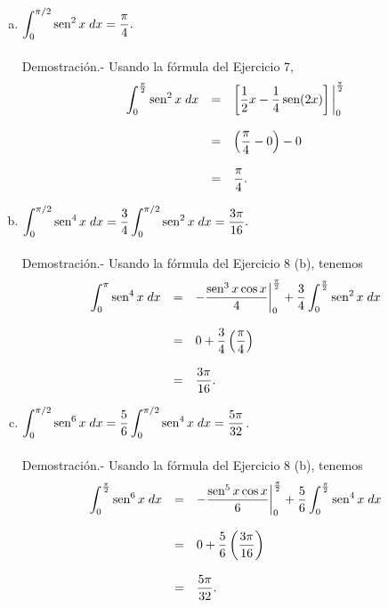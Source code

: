 \begin{enumerate}[\bfseries 1.]
\begin{enumerate}[(a)]
		\item $\displaystyle\int_0^{\pi/2}\sen^2 x\; dx = \dfrac{\pi}{4}.$\\\\
		    Demostración.-\; Usando la fórmula del Ejercicio 7,
		    $$
			\begin{array}{rcl}
			    \displaystyle\int_0^{\frac{\pi}{2}} \sen^2 x\; dx &=& \left[\dfrac{1}{2}x-\dfrac{1}{4}\sen(2x)\right]\bigg|_0^{\frac{\pi}{2}}\\\\
									      &=&\left(\dfrac{\pi}{4}-0\right)-0\\\\
									      &=&\dfrac{\pi}{4}.

			\end{array}
		    $$
		    \vspace{0.5cm}

		\item $\displaystyle\int_0^{\pi/2} \mathop{\mbox{\normalfont sen}}\nolimits^4 x\; dx = \dfrac{3}{4}\int_{0}^{\pi/2}\mathop{\mbox{\normalfont sen}}\nolimits^2x\; dx = \dfrac{3\pi}{16}.$\\\\
		    Demostración.-\; Usando la fórmula del Ejercicio 8 (b), tenemos
		    $$
			\begin{array}{rcl}
			    \displaystyle\int_0^{\pi} \mathop{\mbox{\normalfont sen}}\nolimits^4 x\; dx &=& -\dfrac{\mathop{\mbox{\normalfont sen}}\nolimits^3x\cos x}{4}\bigg|_0^{\frac{\pi}{2}} + \dfrac{3}{4}\displaystyle\int_0^{\frac{\pi}{2}} \mathop{\mbox{\normalfont sen}}\nolimits^2 x\; dx\\\\
								    &=& 0+\dfrac{3}{4}\left(\dfrac{\pi}{4}\right)\\\\
								    &=& \dfrac{3\pi}{16}.
			\end{array}
		    $$
		    \vspace{0.5cm}

		\item $\displaystyle\int_0^{\pi/2} \mathop{\mbox{\normalfont sen}}\nolimits^6 x\; dx = \dfrac{5}{6}\int_0^{\pi/2} \mathop{\mbox{\normalfont sen}}\nolimits^4x\; dx = \dfrac{5\pi}{32}$.\\\\	
		    Demostración.-\;  Usando la fórmula del Ejercicio 8 (b), tenemos
		    $$
		    \begin{array}{rcl}
			\displaystyle\int_0^{\frac{\pi}{2}} \mathop{\mbox{\normalfont sen}}\nolimits^6 x\; dx &=& \displaystyle -\dfrac{\mathop{\mbox{\normalfont sen}}\nolimits^5x\cos x}{6}\bigg|_0^{\frac{\pi}{2}} + \dfrac{5}{6}\int_0^{\frac{\pi}{2}} \mathop{\mbox{\normalfont sen}}\nolimits^4 x\; dx\\\\
									  &=& 0 + \dfrac{5}{6}\left(\dfrac{3\pi}{16}\right)\\\\
									  &=& \dfrac{5\pi}{32}.
		    \end{array}
		    $$
		    \vspace{0.5cm}


\end{enumerate}
\end{enumerate}
